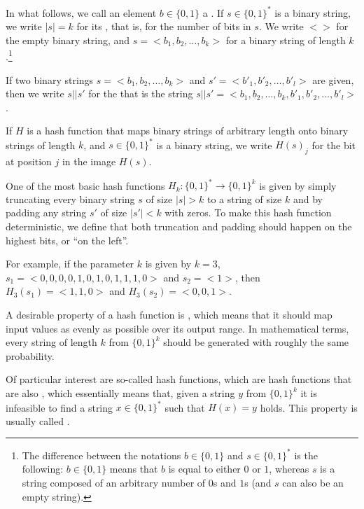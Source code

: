 \begin{notation}
\label{string_and_hash_notations}
In what follows, we call an element $b\in\{0,1\}$ a . If $s\in\{0,1\}^*$ is a binary string, we write $|s|=k$ for its , that is, for the number of bits in $s$. We write $<>$ for the empty binary string, and $s=<b_1,b_2,\ldots,b_k>$ for a binary string of length $k$.\footnote{The difference between the notations $b\in\{0,1\}$ and $s\in\{0,1\}^*$ is the following: $b\in\{0,1\}$ means that $b$ is equal to either $0$ or $1$, whereas $s$ is a string composed of an arbitrary number of $0$s and $1$s (and $s$ can also be an empty string).}

If two binary strings $s=<b_1,b_2,\ldots,b_k>$ and $s'=<b'_1,b'_2,\ldots,b'_l>$ are given, then we write $s||s'$ for the  that is the string 
$s||s'=<b_1,b_2,\ldots,b_k,b'_1,b'_2,\ldots,b'_l>$.

If $H$ is a hash function that maps binary strings of arbitrary length onto binary strings of length $k$, and $s\in\{0,1\}^*$ is a binary string, we write $H(s)_j$ for the bit at position $j$ in the image $H(s)$.
\end{notation}

\begin{example}\label{ex:k-truncation-hash} One of the most basic hash functions $H_k:\{0,1\}^*\to \{0,1\}^k$ is given by simply truncating every binary string $s$ of size $|s|> k$ to a string of size $k$ and by padding any string $s'$ of size $|s'|<k$ with zeros. To make this hash function deterministic, we define that both truncation and padding should happen on the highest bits, or ``on the left''.

For example, if the parameter $k$ is given by $k=3$, $s_1=<0,0,0,0,1,0,1,0,1,1,1,0>$ and $s_2=<1>$, then $H_3(s_1)=<1,1,0>$ and $H_3(s_2)=<0,0,1>$.
\end{example}

A desirable property of a hash function is , which means that it should map input values as evenly as possible over its output range. In mathematical terms, every string of length $k$  from $\{0,1\}^k$ should be generated with roughly the same probability.

Of particular interest are so-called  hash functions, which are hash functions that are also , which essentially means that, given a string $y$ from $\{0,1\}^k$ it is infeasible to find a string $x\in\{0,1\}^*$ such that $H(x)=y$ holds. This property is usually called .

